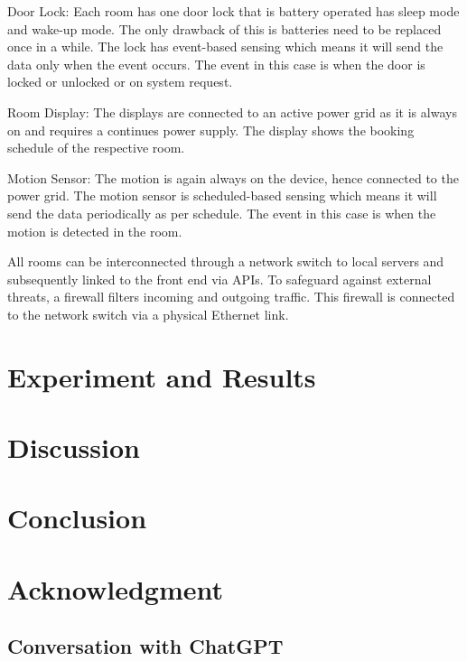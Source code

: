 \documentclass[conference,onecolumn]{IEEEtran}
\begin{document}
	Door Lock: Each room has one door lock that is battery operated has sleep mode and wake-up mode. The only drawback of this is batteries need to be replaced once in a while. The lock has event-based sensing which means it will send the data only when the event occurs. The event in this case is when the door is locked or unlocked or on system request.

	Room Display: The displays are connected to an active power grid as it is always on and requires a continues power supply. The display shows the booking schedule of the respective room.

	Motion Sensor: The motion is again always on the device, hence connected to the power grid. The motion sensor is scheduled-based sensing which means it will send the data periodically as per schedule. The event in this case is when the motion is detected in the room.

	All rooms can be interconnected through a network switch to local servers and subsequently linked to the front end via APIs. To safeguard against external threats, a firewall filters incoming and outgoing traffic. This firewall is connected to the network switch via a physical Ethernet link.


\section{Experiment and Results}
\section{Discussion}


\section{Conclusion}

\section*{Acknowledgment}

\newpage
\appendix

\subsection{Conversation with ChatGPT} \label{appdx:chatgpt}
 
\end{document}
